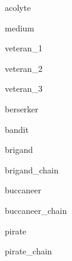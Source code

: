 \documentclass[a4paper,serif]{module}
\begin{document}
\begin{newmonster}{acolyte}\end{newmonster}

\begin{newmonster}{medium}\end{newmonster}

\begin{newmonster}{veteran_1}\end{newmonster}

\begin{newmonster}{veteran_2}\end{newmonster}

\begin{newmonster}{veteran_3}\end{newmonster}

\begin{newmonster}{berserker}\end{newmonster}

\begin{newmonster}{bandit}\end{newmonster}

\begin{newmonster}{brigand}\end{newmonster}

\begin{newmonster}{brigand_chain}\end{newmonster}

\begin{newmonster}{buccaneer}\end{newmonster}

\begin{newmonster}{buccaneer_chain}\end{newmonster}

\begin{newmonster}{pirate}\end{newmonster}

\begin{newmonster}{pirate_chain}\end{newmonster}
\end{document}
